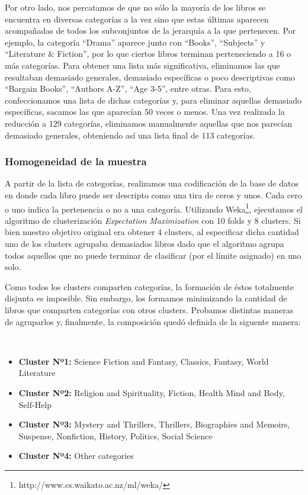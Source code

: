 \documentclass[12pt,journal,compsoc]{IEEEtran}
\begin{document}
Por otro lado, nos percatamos de que no sólo la mayoría de los libros se encuentra en diversas categorías a la vez sino que estas últimas aparecen acompañadas de todos los subconjuntos de la jerarquía a la que pertenecen. Por ejemplo, la categoría ``Drama'' aparece junto con ``Books'', ``Subjects'' y ``Literature \& Fiction'', por lo que ciertos libros terminan perteneciendo a 16 o más categorías. Para obtener una lista más significativa, eliminamos las que resultaban demasiado generales, demasiado específicas o poco descriptivas como ``Bargain Books'', ``Authors A-Z'', ``Age 3-5'', entre otras. Para esto, confeccionamos una lista de dichas categorías y, para eliminar aquellas demasiado específicas, sacamos las que aparecían 50 veces o menos. Una vez realizada la reducción a 129 categorías, eliminamos manualmente aquellas que nos parecían demasiado generales, obteniendo así una lista final de 113 categorías.

\subsubsection{Homogeneidad de la muestra}

A partir de la lista de categorías, realizamos una codificación de la base de datos en donde cada libro puede ser descripto como una tira de ceros y unos. Cada cero o uno indica la pertenencia o no a una categoría. Utilizando Weka\footnote{http://www.cs.waikato.ac.nz/ml/weka/}, ejecutamos el algoritmo de clusterización \textit{Expectation Maximization} con 10 folds y 8 clusters. Si bien nuestro objetivo original era obtener 4 clusters, al especificar dicha cantidad uno de los clusters agrupaba demasiados libros dado que el algoritmo agrupa todos aquellos que no puede terminar de clasificar (por el límite asignado) en uno solo.

Como todos los clusters comparten categorías, la formación de éstos totalmente disjunta es imposible. Sin embargo, los formamos minimizando la cantidad de libros que comparten categorías con otros clusters. Probamos distintas maneras de agruparlos y, finalmente, la composición quedó definida de la siguente manera:

~

\begin{itemize}
\item \textbf{Cluster Nº1:} Science Fiction and Fantasy, Classics, Fantasy, World Literature
\item \textbf{Cluster Nº2:} Religion and Spirituality, Fiction, Health Mind and Body, Self-Help
\item \textbf{Cluster Nº3:} Mystery and Thrillers, Thrillers, Biographies and Memoirs, Suspense, Nonfiction, History, Politics, Social Science
\item \textbf{Cluster Nº4:} Other categories
\end{itemize}
\end{document}
